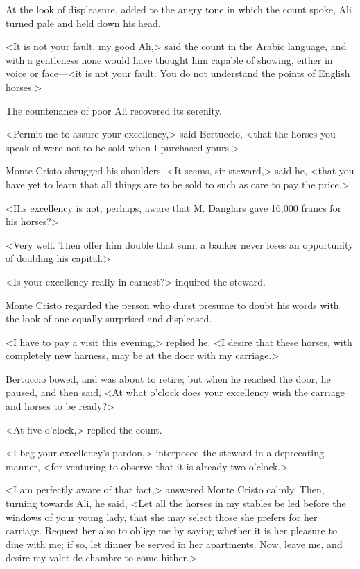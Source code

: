  At the look of displeasure, added to the angry tone in which the count spoke, Ali turned pale and held down his head. 

 <It is not your fault, my good Ali,> said the count in the Arabic language, and with a gentleness none would have thought him capable of showing, either in voice or face—<it is not your fault. You do not understand the points of English horses.> 

 The countenance of poor Ali recovered its serenity. 

 <Permit me to assure your excellency,> said Bertuccio, <that the horses you speak of were not to be sold when I purchased yours.> 

 Monte Cristo shrugged his shoulders. <It seems, sir steward,> said he, <that you have yet to learn that all things are to be sold to such as care to pay the price.> 

 <His excellency is not, perhaps, aware that M. Danglars gave 16,000 francs for his horses?> 

 <Very well. Then offer him double that sum; a banker never loses an opportunity of doubling his capital.> 

 <Is your excellency really in earnest?> inquired the steward. 

 Monte Cristo regarded the person who durst presume to doubt his words with the look of one equally surprised and displeased. 

 <I have to pay a visit this evening,> replied he. <I desire that these horses, with completely new harness, may be at the door with my carriage.> 

 Bertuccio bowed, and was about to retire; but when he reached the door, he paused, and then said, <At what o'clock does your excellency wish the carriage and horses to be ready?> 

 <At five o'clock,> replied the count. 

 <I beg your excellency's pardon,> interposed the steward in a deprecating manner, <for venturing to observe that it is already two o'clock.> 

 <I am perfectly aware of that fact,> answered Monte Cristo calmly. Then, turning towards Ali, he said, <Let all the horses in my stables be led before the windows of your young lady, that she may select those she prefers for her carriage. Request her also to oblige me by saying whether it is her pleasure to dine with me; if so, let dinner be served in her apartments. Now, leave me, and desire my valet de chambre to come hither.> 

